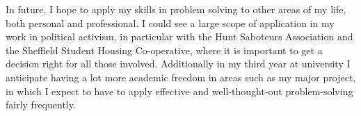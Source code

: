 \documentclass[a4paper,11pt]{article} %
\begin{document}
In future, I hope to apply my skills in problem solving to other areas of my life, both personal and professional.  I could see a large scope of application in my work in political activism, in particular with the Hunt Saboteurs Association and the Sheffield Student Housing Co-operative, where it is important to get a decision right for all those involved.  Additionally in my third year at university I anticipate having a lot more academic freedom in areas such as my major project, in which I expect to have to apply effective and well-thought-out problem-solving fairly frequently.
\end{document}
